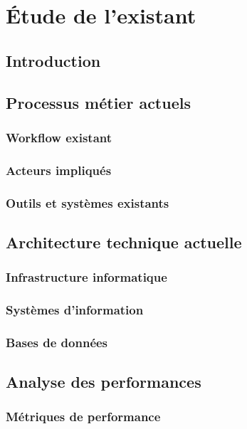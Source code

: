 \chapter{Étude de l'existant}

\section{Introduction}

\section{Processus métier actuels}

\subsection{Workflow existant}

\subsection{Acteurs impliqués}

\subsection{Outils et systèmes existants}

\section{Architecture technique actuelle}

\subsection{Infrastructure informatique}

\subsection{Systèmes d'information}

\subsection{Bases de données}

\section{Analyse des performances}

\subsection{Métriques de performance}

